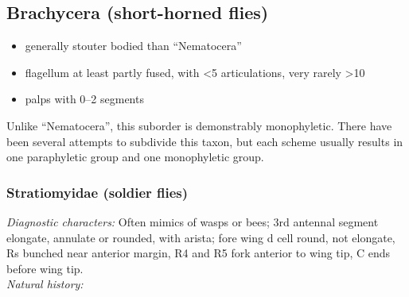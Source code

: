 \documentclass[letterpaper, 11pt]{article}
\begin{document}
\subsection{Brachycera (short-horned flies)}
\begin{itemize}
\item generally stouter bodied than ``Nematocera''
\item flagellum at least partly fused, with \textless5 articulations, very rarely \textgreater10
\item palps with 0--2 segments
\end{itemize}
Unlike ``Nematocera'', this suborder is demonstrably monophyletic. There have been several attempts to subdivide this taxon, but each scheme usually results in one paraphyletic group and one monophyletic group.

\subsubsection{Stratiomyidae (soldier flies)}
\noindent{}\textit{Diagnostic characters:} Often mimics of wasps or bees; 3rd antennal segment elongate, annulate or rounded, with arista; fore wing d cell round, not elongate, Rs bunched near anterior margin, R4 and R5 fork anterior to wing tip, C ends before wing tip.\\

\noindent{}\textit{Natural history:} \\
\end{document}
